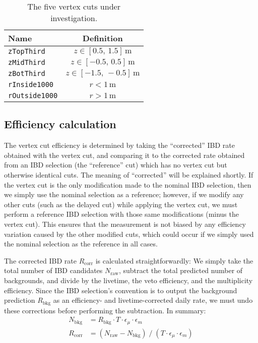 \documentclass[../thesis.tex]{subfiles}
\begin{document}
\begin{table}[h]
  \begin{tabular}{lc}
    \toprule
    Name & Definition \\
    \midrule
    \texttt{zTopThird} & $z \in [0.5,\, 1.5]\,\mathrm{m}$ \\
    \texttt{zMidThird} & $z \in [-0.5,\, 0.5]\,\mathrm{m}$ \\
    \texttt{zBotThird} & $z \in [-1.5,\, -0.5]\,\mathrm{m}$ \\
    \texttt{rInside1000} & $r < 1\,\mathrm{m}$ \\
    \texttt{rOutside1000} & $r > 1\,\mathrm{m}$ \\
    \bottomrule
  \end{tabular}
  \caption{The five vertex cuts under investigation.}
  \label{tab:cutVaryVtxCutCutsTbl}
\end{table}

\begin{comment}
  TODO Try doing vertex efficiency with background subtraction. Oh wait we already do.
\end{comment}

\subsection{Efficiency calculation}
\label{sec:cutVaryVtxCutEffCalc}

The vertex cut efficiency is determined by taking the ``corrected'' IBD rate obtained with the vertex cut, and comparing it to the corrected rate obtained from an IBD selection (the ``reference'' cut) which has no vertex cut but otherwise identical cuts. The meaning of ``corrected'' will be explained shortly. If the vertex cut is the only modification made to the nominal IBD selection, then we simply use the nominal selection as a reference; however, if we modify any other cuts (such as the delayed cut) while applying the vertex cut, we must perform a reference IBD selection with those same modifications (minus the vertex cut). This ensures that the measurement is not biased by any efficiency variation caused by the other modified cuts, which could occur if we simply used the nominal selection as the reference in all cases.

The corrected IBD rate $R_{\mathrm{corr}}$ is calculated straightforwardly: We simply take the total number of IBD candidates $N_{\mathrm{raw}}$, subtract the total predicted number of backgrounds, and divide by the livetime, the veto efficiency, and the multiplicity efficiency.
Since the IBD selection's convention is to output the background prediction $R_{\mathrm{bkg}}$ as an efficiency- and livetime-corrected daily rate, we must undo these corrections before performing the subtraction. In summary:
\begin{align*}
  N_{\mathrm{bkg}} &= R_{\mathrm{bkg}} \cdot T \cdot \epsilon_\mu \cdot \epsilon_m\\
  R_{\mathrm{corr}} &= (N_{\mathrm{raw}} - N_{\mathrm{bkg}}) \;/\; (T \cdot \epsilon_\mu \cdot \epsilon_m)
\end{align*}
\end{document}
